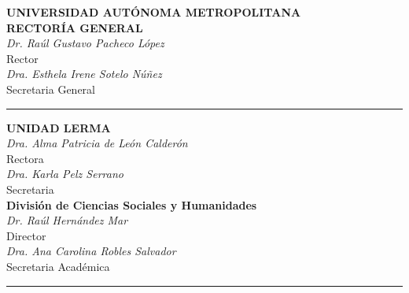 \clearpage
  \begingroup
    \thispagestyle{empty}
      \begin{center}
        \sffamily\small
        {\montserrat\Large\textbf{UNIVERSIDAD AUTÓNOMA METROPOLITANA}} \\
        {\montserrat\large\textbf{RECTORÍA GENERAL}} \\
        \vspace{0.2cm}
        \textit{Dr. Raúl Gustavo Pacheco López} \\
        Rector \\
        \vspace{0.1cm}
        {\itshape Dra. Esthela Irene Sotelo Núñez} \\
        Secretaria General\\
        
        \vspace{0.1cm}
        \rule{0.6\textwidth}{0.4pt}
        \vspace{0.1cm}
        
        {\montserrat\large\textbf{UNIDAD LERMA}} \\
        \vspace{0.2cm}
        \textit{Dra. Alma Patricia de León Calderón} \\
        Rectora \\
        \vspace{0.1cm}
        {\itshape Dra. Karla Pelz Serrano} \\
        Secretaria \\
        \vspace{0.1cm}
        {\montserrat\large\textbf{División de Ciencias Sociales y Humanidades}} \\
        \vspace{0.1cm}
        \textit{Dr. Raúl Hernández Mar} \\
        Director \\
        \vspace{0.1cm}
        \textit{Dra. Ana Carolina Robles Salvador} \\
        Secretaria Académica \\
  
        \rule{0.6\textwidth}{0.4pt}
  

\end{center}
